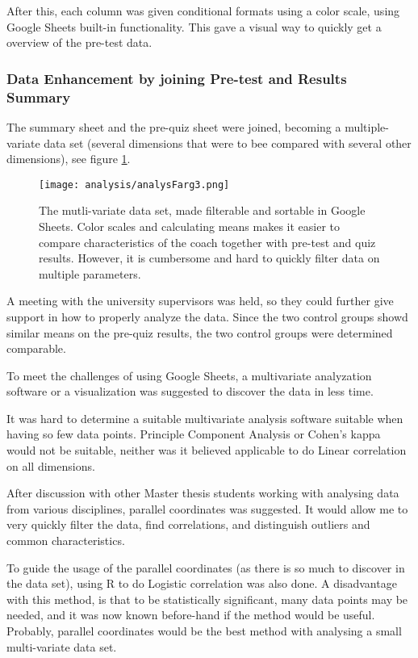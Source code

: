 After this, each column was given conditional formats using a color scale, using Google Sheets built-in functionality. This gave a visual way to quickly get a overview of the pre-test data.

\subsubsection{Data Enhancement by joining Pre-test and Results Summary}

The summary sheet and the pre-quiz sheet were joined, becoming a multiple-variate data set (several dimensions that were to bee compared with several other dimensions), see figure \ref{fig:analysFarg3}.

\begin{figure}[h]
    \centering
    \texttt{[image: analysis/analysFarg3.png]}
    \caption{The mutli-variate data set, made filterable and sortable in Google Sheets. Color scales and calculating means makes it easier to compare characteristics of the coach together with pre-test and quiz results. However, it is cumbersome and hard to quickly filter data on multiple parameters.}
    \label{fig:analysFarg3}
\end{figure}

A meeting with the university supervisors was held, so they could further give support in how to properly analyze the data. Since the two control groups showd similar means on the pre-quiz results, the two control groups were determined comparable.

To meet the challenges of using Google Sheets, a multivariate analyzation software or a visualization was suggested to discover the data in less time.

It was hard to determine a suitable multivariate analysis software suitable when having so few data points. Principle Component Analysis or Cohen's kappa would not be suitable, neither was it believed applicable to do Linear correlation on all dimensions.

After discussion with other Master thesis students working with analysing data from various disciplines, parallel coordinates was suggested. It would allow me to very quickly filter the data, find correlations, and distinguish outliers and common characteristics.

To guide the usage of the parallel coordinates (as there is so much to discover in the data set), using R to do Logistic correlation was also done. A disadvantage with this method, is that to be statistically significant, many data points may be needed, and it was now known before-hand if the method would be useful. Probably, parallel coordinates would be the best method with analysing a small multi-variate data set.

